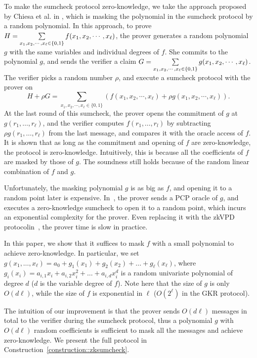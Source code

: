 To make the sumcheck protocol zero-knowledge, we take the approach proposed by Chiesa et al. in \cite{zksumcheck}, which is masking the polynomial in the sumcheck protocol by a random polynomial. In this approach, to prove $H = \sum\limits_{x_1, x_2, \cdots, x_\ell \in \{0,1\}}f(x_1, x_2, \cdots, x_\ell)$, the prover generates a random polynomial $g$ with the same variables and individual degrees of $f$. She commits to the polynomial $g$, and sends the verifier a claim $G = \sum\limits_{x_1, x_2, \cdots, x_\ell \in \{0,1\}}g(x_1, x_2, \cdots, x_\ell)$. The verifier picks a random number $\rho$, and execute a sumcheck protocol with the prover on $$H + \rho G = \sum\limits_{x_1, x_2, \cdots, x_\ell \in \{0, 1\}}(f(x_1, x_2, \cdots, x_\ell) + \rho g(x_1, x_2, \cdots, x_\ell)).$$ At the last round of this sumcheck, the prover opens the commitment of $g$ at $g(r_1, \ldots, r_\ell)$, and the verifier computes $f(r_1, \ldots, r_l)$ by subtracting $\rho g(r_1, \ldots, r_\ell)$ from the last message, and compares it with the oracle access of $f$. It is shown that as long as the commitment and opening of $f$ are zero-knowledge, the protocol is zero-knowledge. Intuitively, this is because all the coefficients of $f$ are masked by those of $g$. The soundness still holds because of the random linear combination of $f$ and $g$. 

Unfortunately, the masking polynomial $g$ is as big as $f$, and opening it to a random point later is expensive. In~\cite{zksumcheck}, the prover sends a PCP oracle of $g$, and executes a zero-knowledge sumcheck to open it to a random point, which incurs an exponential complexity for the prover. Even replacing it with the zkVPD protocolin~\cite{zkvpd}, the prover time is slow in practice.

In this paper, we show that it suffices to mask $f$ with a small polynomial to achieve zero-knowledge. In particular, we set $g(x_1, \ldots, x_\ell) = a_{0} + g_1(x_1) + g_2(x_2) + \ldots + g_\ell(x_\ell)$, where $g_{i}(x_i) = a_{i,1}x_i + a_{i,2}x_i^2 + \ldots + a_{i,d}x_i^d$ is a random univariate polynomial of degree $d$ ($d$ is the variable degree of $f$). Note here that the size of $g$ is only $O(d\ell)$, while the size of $f$ is exponential in $\ell$ ($O(2^\ell)$ in the GKR protocol).

The intuition of our improvement is that the prover sends $O(d\ell)$ messages in total to the verifier during the sumcheck protocol, thus a polynomial $g$ with $O(d\ell)$ random coefficients is sufficient to mask all the messages and achieve zero-knowledge. We present the full protocol in Construction~\ref{construction::zksumcheck}.



